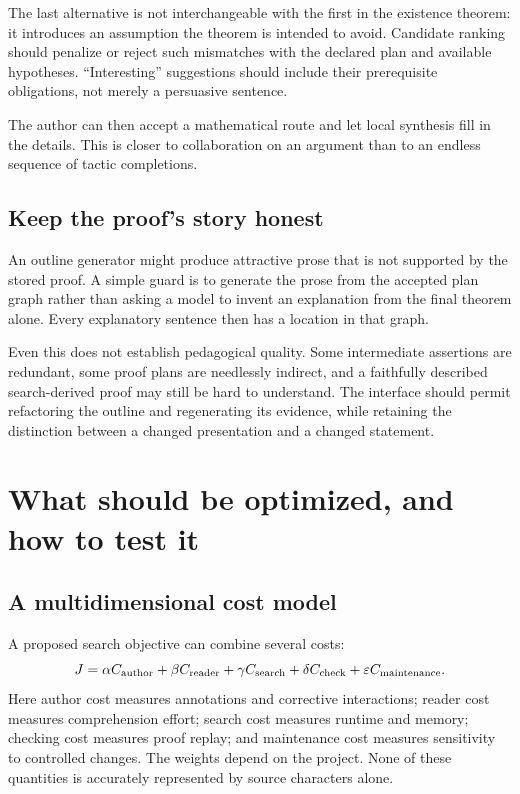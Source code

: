 \documentclass[11pt,a4paper]{article}
\theoremstyle{definition}
\theoremstyle{remark}
\numberwithin{equation}{section}
\begin{document}
The last alternative is not interchangeable with the first in the existence theorem: it introduces an assumption the theorem is intended to avoid. Candidate ranking should penalize or reject such mismatches with the declared plan and available hypotheses. ``Interesting'' suggestions should include their prerequisite obligations, not merely a persuasive sentence.

The author can then accept a mathematical route and let local synthesis fill in the details. This is closer to collaboration on an argument than to an endless sequence of tactic completions.

\subsection{Keep the proof's story honest}
An outline generator might produce attractive prose that is not supported by the stored proof. A simple guard is to generate the prose from the accepted plan graph rather than asking a model to invent an explanation from the final theorem alone. Every explanatory sentence then has a location in that graph.

Even this does not establish pedagogical quality. Some intermediate assertions are redundant, some proof plans are needlessly indirect, and a faithfully described search-derived proof may still be hard to understand. The interface should permit refactoring the outline and regenerating its evidence, while retaining the distinction between a changed presentation and a changed statement.

\section{What should be optimized, and how to test it}
\label{sec:evaluation}
\subsection{A multidimensional cost model}
A proposed search objective can combine several costs:
\begin{equation}\label{eq:cost}
 J=\alpha C_{\rm author}+\beta C_{\rm reader}
   +\gamma C_{\rm search}+\delta C_{\rm check}
   +\varepsilon C_{\rm maintenance}.
\end{equation}
Here author cost measures annotations and corrective interactions; reader cost measures comprehension effort; search cost measures runtime and memory; checking cost measures proof replay; and maintenance cost measures sensitivity to controlled changes. The weights depend on the project. None of these quantities is accurately represented by source characters alone.
\end{document}

